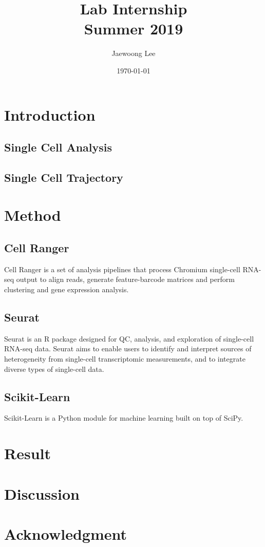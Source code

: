 \documentclass[aps, 10pt, a4paper]{article}
\title{Lab Internship\\Summer 2019}
\author{Jaewoong Lee}
\date{\today}
\begin{document}
    \maketitle
    \newpage
    
    \tableofcontents
    \listoftables
    \listoffigures
    \listoflistings
    \newpage
    
    \section{Introduction}
        \subsection{Single Cell Analysis}
        
        \subsection{Single Cell Trajectory}
    
    \section{Method}
        \subsection{Cell Ranger}
            Cell Ranger is a set of analysis pipelines that process Chromium single-cell RNA-seq output to align reads, generate feature-barcode matrices and perform clustering and gene expression analysis. \cite{ref:cellranger}
        
        \subsection{Seurat}
            Seurat is an R package designed for QC, analysis, and exploration of single-cell RNA-seq data. Seurat aims to enable users to identify and interpret sources of heterogeneity from single-cell transcriptomic measurements, and to integrate diverse types of single-cell data. \cite{ref:seurat1, ref:seurat2}
        
        \subsection{Scikit-Learn}
            Scikit-Learn is a Python module for machine learning built on top of SciPy. \cite{ref:scikit}
    
    \section{Result}
    
    \section{Discussion}
    
    \section{Acknowledgment}
    
    
    

    
\end{document}

